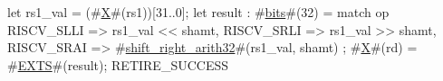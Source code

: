 let rs1_val = (#\hyperref[sailRISCVzX]{X}#(rs1))[31..0];
let result : #\hyperref[sailRISCVzbits]{bits}#(32) = match op {
  RISCV_SLLI => rs1_val << shamt,
  RISCV_SRLI => rs1_val >> shamt,
  RISCV_SRAI => #\hyperref[sailRISCVzshiftzyrightzyarith32]{shift\_right\_arith32}#(rs1_val, shamt)
};
#\hyperref[sailRISCVzX]{X}#(rd) = #\hyperref[sailRISCVzEXTS]{EXTS}#(result);
RETIRE_SUCCESS
